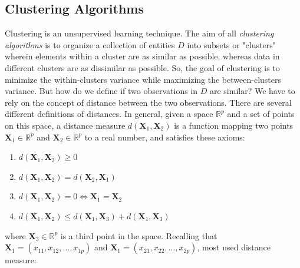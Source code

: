 \subsection{Clustering Algorithms}
\label{sec:clustering}
Clustering is an unsupervised learning technique. The aim of all \emph{clustering algorithms} is to organize a collection of entities $D$ into subsets or "clusters" wherein elements within a cluster are as similar as possible, whereas data in different clusters are as dissimilar as possible. So, the goal of clustering is to minimize the within-clusters variance while maximizing the between-clusters variance. But how do we define if two observations in $D$ are similar? We have to rely on the concept of distance between the two observations. There are several different definitions of distances. In general, given a space $\mathbb{R}^p$ and a set of points on this space, a distance measure $d\left(\mathbf{X}_1,\mathbf{X}_2\right)$ is a function mapping two points $\mathbf{X}_1\in\mathbb{R}^p$ and $\mathbf{X}_2\in\mathbb{R}^p$ to a real number, and satisfies these axioms:
\begin{enumerate}
    \item $d\left(\mathbf{X}_1,\mathbf{X}_2\right) \geq 0$
    \item $d\left(\mathbf{X}_1,\mathbf{X}_2\right) = d\left(\mathbf{X}_2,\mathbf{X}_1\right)$
    \item $d\left(\mathbf{X}_1,\mathbf{X}_2\right)=0 \Leftrightarrow \mathbf{X}_1 = \mathbf{X}_2$
    \item $d\left(\mathbf{X}_1,\mathbf{X}_2\right) \leq d\left(\mathbf{X}_1,\mathbf{X}_3\right) + d\left(\mathbf{X}_1,\mathbf{X}_3\right)$
\end{enumerate}
where $\mathbf{X}_3 \in \mathbb{R}^p$ is a third point in the space. Recalling that $\mathbf{X}_1=\left(x_{11}, x_{12}, \dots, x_{1p} \right)$ and $\mathbf{X}_1=\left(x_{21}, x_{22}, \dots, x_{2p} \right)$, most used distance measure:
